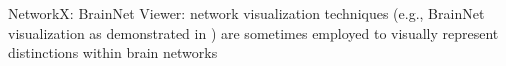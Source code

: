 NetworkX: 
BrainNet Viewer: network visualization techniques 
(e.g., BrainNet visualization as 
demonstrated in \cite{Xia2013}) are sometimes employed to visually
represent distinctions within brain networks \cite{Tang2023}
